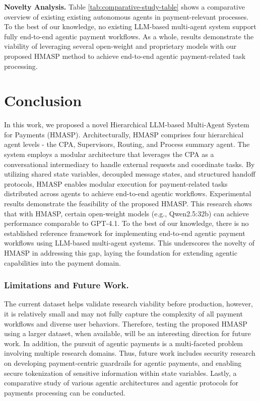 \documentclass[runningheads]{llncs}
\begin{document}
\noindent\textbf{Novelty Analysis.} Table \ref{tab:comparative-study-table} shows a comparative overview of existing existing autonomous agents in payment-relevant processes. To the best of our knowledge, no existing LLM-based multi-agent system support fully end-to-end agentic payment workflows. As a whole, results demonstrate the viability of leveraging several open-weight and proprietary models with our proposed HMASP method to achieve end-to-end agentic payment-related task processing.

\section{Conclusion}
In this work, we proposed a novel Hierarchical LLM-based Multi-Agent System for Payments (HMASP). Architecturally, HMASP comprises four hierarchical agent levels - the CPA, Supervisors, Routing, and Process summary agent. 
The system employs a modular architecture that leverages the CPA as a conversational intermediary to handle external requests and coordinate tasks. 
By utilizing shared state variables, decoupled message states, and structured handoff protocols, HMASP enables modular execution for payment-related tasks distributed across agents to achieve end-to-end agentic workflows. 
Experimental results demonstrate the feasibility of the proposed HMASP. This research shows that with HMASP, certain open-weight models (e.g., Qwen2.5:32b) can achieve performance comparable to GPT-4.1. 
To the best of our knowledge, there is no established reference framework for implementing end-to-end agentic payment workflows using LLM-based multi-agent systems. This underscores the novelty of HMASP in addressing this gap, laying the foundation for extending agentic capabilities into the payment domain.

\subsubsection{Limitations and Future Work.}
The current dataset helps validate research viability before production, however, it is relatively small and may not fully capture the complexity of all payment workflows and diverse user behaviors. Therefore, testing the proposed HMASP using a larger dataset, when available, will be an interesting direction for future work.
In addition, the pursuit of agentic payments is a multi-faceted problem involving multiple research domains. Thus, future work includes security research on developing payment-centric guardrails for agentic payments, and enabling secure tokenization of sensitive information within state variables. 
Lastly, a comparative study of various agentic architectures and agentic protocols for payments processing can be conducted.

%
%
%


\end{document}
